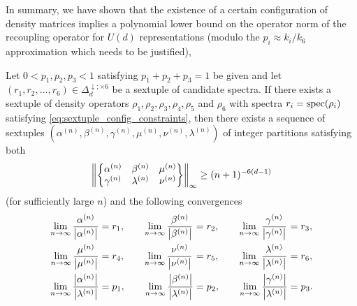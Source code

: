 \documentclass[notitlepage]{article}
\begin{document}
In summary, we have shown that the existence of a certain configuration of density matrices implies a polynomial lower bound on the operator norm of the recoupling operator for $U(d)$ representations (modulo the $p_i \approx k_i/k_6$ approximation which needs to be justified),
\begin{thm}
    Let $0 < p_1, p_2, p_3 < 1$ satisfying $p_1 + p_2 + p_3 = 1$ be given and let $(r_1, r_2, \ldots, r_6) \in \Delta_{d}^{\downarrow; \times 6}$ be a sextuple of candidate spectra.
    If there exists a sextuple of density operators $\rho_1, \rho_2, \rho_3, \rho_4, \rho_5$ and $\rho_6$ with spectra $r_i = \operatorname{spec}(\rho_i)$ satisfying \cref{eq:sextuple_config_constraints}, then there exists a sequence of sextuples $(\alpha^{(n)}, \beta^{(n)}, \gamma^{(n)}, \mu^{(n)}, \nu^{(n)}, \lambda^{(n)})$ of integer partitions satisfying both
    \begin{equation}
        \label{eq:sequential_recoupling_norm_lower_bound}
        \left\lVert\begin{Bmatrix} \alpha^{(n)} & \beta^{(n)} & \mu^{(n)} \\ \gamma^{(n)} & \lambda^{(n)} & \nu^{(n)} \end{Bmatrix}\right\rVert_{\infty}
        \geq (n+1)^{-6(d-1)}
    \end{equation}
    (for sufficiently large $n$) and the following convergences
    \begin{equation}
        \label{eq:sextuple_convergence_condition}
        \begin{alignedat}{3}
            \lim_{n\to\infty} \frac{\alpha^{(n)}}{\left|\alpha^{(n)}\right|} &= r_1, \qquad
            \lim_{n\to\infty} \frac{\beta^{(n)}}{\left|\beta^{(n)}\right|} &&= r_2, \qquad
            \lim_{n\to\infty} \frac{\gamma^{(n)}}{\left|\gamma^{(n)}\right|} &&= r_3, \\
            \lim_{n\to\infty} \frac{\mu^{(n)}}{\left|\mu^{(n)}\right|} &= r_4, \qquad
            \lim_{n\to\infty} \frac{\nu^{(n)}}{\left|\nu^{(n)}\right|} &&= r_5, \qquad
            \lim_{n\to\infty} \frac{\lambda^{(n)}}{\left|\lambda^{(n)}\right|} &&= r_6, \\
            \lim_{n\to\infty} \frac{\left|\alpha^{(n)}\right|}{\left|\lambda^{(n)}\right|} &= p_1, \qquad
            \lim_{n\to\infty} \frac{\left|\beta^{(n)}\right|}{\left|\lambda^{(n)}\right|} &&= p_2, \qquad
            \lim_{n\to\infty} \frac{\left|\gamma^{(n)}\right|}{\left|\lambda^{(n)}\right|} &&= p_3.
        \end{alignedat}
    \end{equation}
\end{thm}
\end{document}
